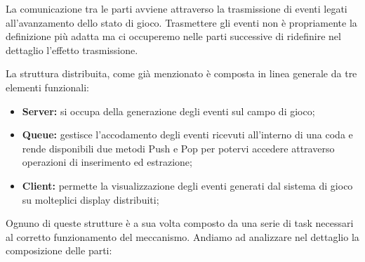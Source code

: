 \documentclass[aps,letterpaper,10pt]{article}
\begin{document}
La comunicazione tra le parti avviene attraverso la trasmissione di eventi legati all'avanzamento dello stato di gioco.
Trasmettere gli eventi non \`e propriamente la definizione pi\`u adatta ma ci occuperemo nelle parti successive di
ridefinire nel dettaglio l'effetto trasmissione. \vspace{3mm}

La struttura distribuita, come gi\`a menzionato \`e composta in linea generale da tre elementi funzionali:

\begin{itemize}
	\item \textbf{Server:} si occupa della generazione degli eventi sul campo di gioco;
\item \textbf{Queue:} gestisce l'accodamento degli eventi ricevuti all'interno di una coda e rende disponibili due
metodi Push e Pop per potervi accedere attraverso operazioni di inserimento ed estrazione;
\item \textbf{Client:} permette la visualizzazione degli eventi generati dal sistema di gioco su molteplici display
distribuiti;
\end{itemize}

Ognuno di queste strutture \`e a sua volta composto da una serie di task necessari al corretto funzionamento del
meccanismo. Andiamo ad analizzare nel dettaglio la composizione delle parti:
\end{document}
